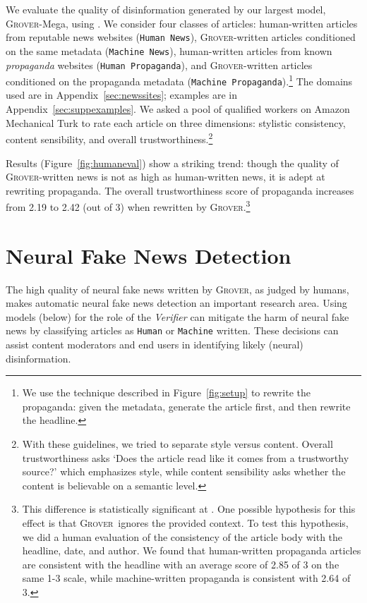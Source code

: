 \documentclass{article}
\newcommand{\modelname}{{\textsc{Grover}}}
\begin{document}
We evaluate the quality of disinformation generated by our largest model, \modelname-Mega, using . We consider four classes of articles: 
human-written articles from reputable news websites ({\tt\small Human News}), 
\modelname-written articles conditioned on the same metadata ({\tt\small Machine News}),
human-written articles from known \emph{propaganda} websites ({\tt\small Human Propaganda}),
and \modelname-written articles conditioned on the propaganda metadata ({\tt\small Machine Propaganda}).\footnote{We use the technique described in Figure~\ref{fig:setup} to rewrite the propaganda: given the metadata, generate the article first, and then rewrite the headline.} The domains used are in Appendix~\ref{sec:newssites}; examples are in Appendix~\ref{sec:suppexamples}. We asked a pool of qualified workers on Amazon Mechanical Turk to rate each article on three dimensions: stylistic consistency, content sensibility, and overall trustworthiness.\footnote{With these guidelines, we tried to separate style versus content. Overall trustworthiness asks `Does the article read like it comes from a trustworthy source?' which emphasizes style, while content sensibility asks whether the content is believable on a semantic level.}

Results (Figure~\ref{fig:humaneval}) show a striking trend: though the quality of \modelname-written news is not as high as human-written news, it is adept at rewriting propaganda. The overall trustworthiness score of propaganda increases from 2.19 to 2.42 (out of 3) when rewritten by \modelname.\footnote{This difference is statistically significant at . One possible hypothesis for this effect is that \modelname~ignores the provided context. To test this hypothesis, we did a human evaluation of the consistency of the article body with the headline, date, and author. We found that human-written propaganda articles are consistent with the headline with an average score of 2.85 of 3 on the same 1-3 scale, while machine-written propaganda is consistent with 2.64 of 3.}
 
\section{Neural Fake News Detection}
\label{sec:detection}
The high quality of neural fake news written by \modelname, as judged by humans, makes automatic neural fake news detection an important research area. Using models (below) for the role of the \emph{Verifier} can mitigate the harm of neural fake news by classifying articles as {\tt\small Human} or {\tt\small Machine} written. These decisions can assist content moderators and end users in identifying likely (neural) disinformation. 
\end{document}
